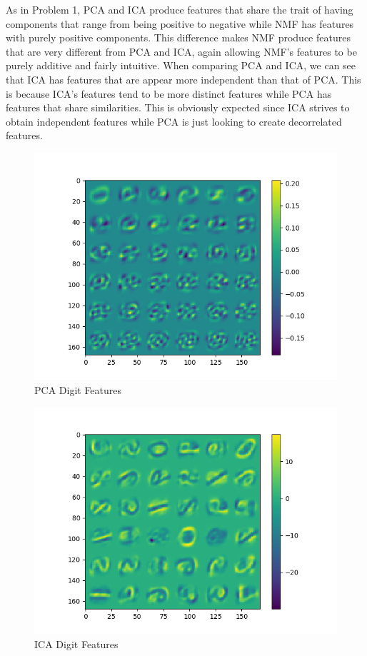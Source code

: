 \documentclass{article}[12pt]
\begin{document}
   As in Problem 1, PCA and ICA produce features that share the trait of having components that range from being positive to negative while NMF has features with purely positive components. This difference makes NMF produce features that are very different from PCA and ICA, again allowing NMF's features to be purely additive and fairly intuitive. When comparing PCA and ICA, we can see that ICA has features that are appear more independent than that of PCA. This is because ICA's features tend to be more distinct features while PCA has features that share similarities. This is obviously expected since ICA strives to obtain independent features while PCA is just looking to create decorrelated features.
   
   \begin{figure}[ht]
   \centerline{
   \includegraphics[scale=0.7]{p2/pca_features_digits.png}}
   \caption{PCA Digit Features}
   \label{fig:pca_dig_f}
   \end{figure}
   
   \begin{figure}[ht]
   \centerline{
   \includegraphics[scale=0.7]{p2/ica_features_digits.png}}
   \caption{ICA Digit Features}
   \label{fig:ica_dig_f}
   \end{figure}
   
\end{document}
